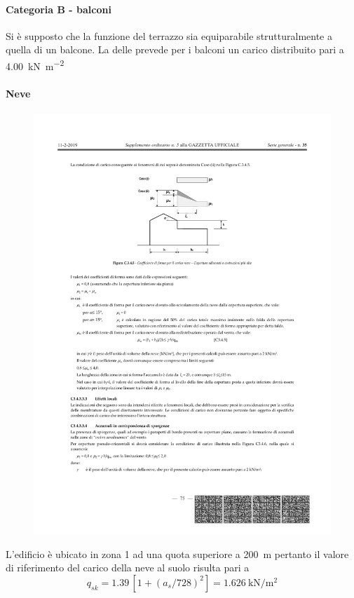 \paragraph*{Categoria B - balconi} Si è supposto che la funzione del terrazzo sia equiparabile strutturalmente a quella di un balcone. 
La  delle  prevede per i balconi un carico distribuito pari a \SI{4.00}{\kilo\newton\per\square\meter}
\paragraph*{Neve}
\begin{figure}[htbp]
\centering
\includegraphics{IMG/figC3-4-5.pdf}
\label{fig:C345}
\end{figure}
L'edificio è ubicato in zona 1 ad una quota superiore a \SI{200}{\meter} pertanto il valore di riferimento del carico della neve al suolo risulta pari a
\[
	q_{sk}=1.39 \, [1+(a_s/728)^2] = \SI{1.626}{\kilo\newton\per\square\meter}
\]

